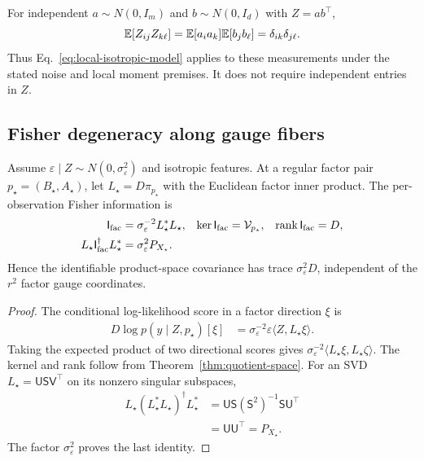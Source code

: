 \begin{proposition}
For independent $a\sim N(0,I_m)$ and $b\sim N(0,I_d)$ with
$Z=ab^\top$,
\begin{equation}
\mathbb E[Z_{ij}Z_{k\ell}]
=\mathbb E[a_ia_k]\mathbb E[b_jb_\ell]
=\delta_{ik}\delta_{j\ell}.
\end{equation}
Thus Eq.~\eqref{eq:local-isotropic-model} applies to these
measurements under the stated noise and local moment premises.
It does not require independent entries in $Z$.
\end{proposition}

\subsection{Fisher degeneracy along gauge fibers}
\begin{theorem}
\label{thm:local-fisher-gauge}
Assume $\varepsilon\mid Z\sim N(0,\sigma_\varepsilon^2)$ and
isotropic features. At a regular factor pair $p_\star=(B_\star,A_\star)$,
let $L_\star=D\pi_{p_\star}$ with the Euclidean factor inner product.
The per-observation Fisher information is
\begin{align}
\mathsf I_{\rm fac}
&=\sigma_\varepsilon^{-2}L_\star^*L_\star,&
\ker\mathsf I_{\rm fac}&=\mathcal V_{p_\star},&
\operatorname{rank}\mathsf I_{\rm fac}&=D,\\
L_\star\mathsf I_{\rm fac}^\dagger L_\star^*
&=\sigma_\varepsilon^2P_{X_\star}.
\label{eq:local-fisher-gauge}
\end{align}
Hence the identifiable product-space covariance has trace
$\sigma_\varepsilon^2D$, independent of the $r^2$ factor gauge
coordinates.
\end{theorem}
\begin{proof}
The conditional log-likelihood score in a factor direction $\xi$ is
\begin{align}
D\log p(y\mid Z,p_\star)[\xi]
&=\sigma_\varepsilon^{-2}\varepsilon\langle Z,L_\star\xi\rangle .
\end{align}
Taking the expected product of two directional scores gives
$\sigma_\varepsilon^{-2}\langle L_\star\xi,L_\star\zeta\rangle$.
The kernel and rank follow from Theorem~\ref{thm:quotient-space}.
For an SVD $L_\star=\mathsf U\mathsf S\mathsf V^\top$ on its
nonzero singular subspaces,
\begin{align}
L_\star(L_\star^*L_\star)^\dagger L_\star^*
&=\mathsf U\mathsf S(\mathsf S^2)^{-1}\mathsf S\mathsf U^\top\\
&=\mathsf U\mathsf U^\top=P_{X_\star}.
\end{align}
The factor $\sigma_\varepsilon^2$ proves the last identity.
\end{proof}


